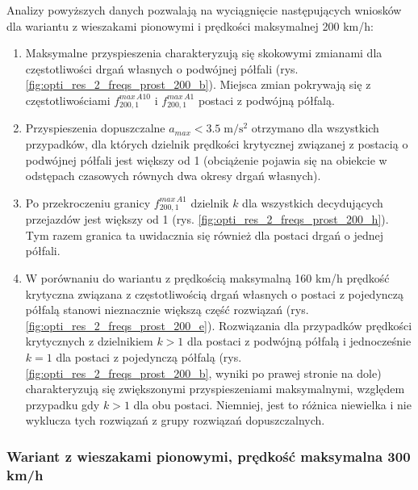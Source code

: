 Analizy powyższych danych pozwalają na wyciągnięcie następujących wniosków dla wariantu z wieszakami pionowymi i prędkości maksymalnej 200 km/h:
\begin{enumerate}
	\item Maksymalne przyspieszenia charakteryzują się skokowymi zmianami dla częstotliwości drgań własnych o podwójnej półfali (rys. \ref{fig:opti_res_2_freqs_prost_200_b}). Miejsca zmian pokrywają się z częstotliwościami $f_{200,1}^{max\,A10}$ i $f_{200,1}^{max\,A1}$ postaci z podwójną półfalą. 
	\item Przyspieszenia dopuszczalne $a_{max}<3.5\;\mathrm{m/s^2}$ otrzymano dla wszystkich przypadków, dla których dzielnik prędkości krytycznej związanej z postacią o podwójnej półfali jest większy od 1 (obciążenie pojawia się na obiekcie w odstępach czasowych równych dwa okresy drgań własnych).
	\item Po przekroczeniu granicy $f_{200,1}^{max\,A1}$  dzielnik $k$ dla wszystkich decydujących przejazdów jest większy od 1 (rys. \ref{fig:opti_res_2_freqs_prost_200_h}). Tym razem granica ta uwidacznia się również dla postaci drgań o jednej półfali. 

	\item W porównaniu do wariantu z prędkością maksymalną 160 km/h prędkość krytyczna związana z częstotliwością drgań własnych o postaci z pojedynczą półfalą stanowi nieznacznie większą część rozwiązań (rys. \ref{fig:opti_res_2_freqs_prost_200_e}). Rozwiązania dla przypadków prędkości krytycznych z dzielnikiem $k>1$ dla postaci z podwójną półfalą i jednocześnie $k=1$ dla postaci z pojedynczą półfalą (rys. \ref{fig:opti_res_2_freqs_prost_200_b}, wyniki po prawej stronie na dole) charakteryzują się zwiększonymi przyspieszeniami maksymalnymi, względem przypadku gdy $k>1$ dla obu postaci. Niemniej, jest to różnica niewielka i nie wyklucza tych rozwiązań z grupy rozwiązań dopuszczalnych.
\end{enumerate}
\vfill

\subsubsection{Wariant z wieszakami pionowymi, prędkość maksymalna 300 km/h}


